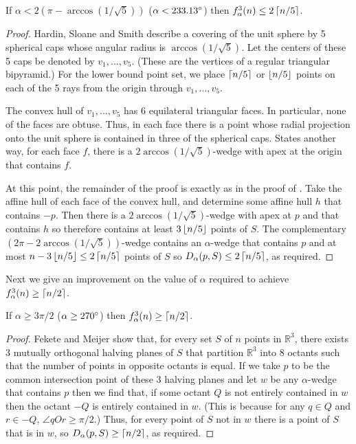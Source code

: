 \documentclass[lotsofwhite]{patmorin}
\newcommand{\R}{\mathbb{R}}
\begin{document}
\begin{lem}
If $\alpha < 2(\pi-\arccos(1/\sqrt{5}))$ ($\alpha < 233.13^\circ$) then $f^3_\alpha(n) \le 2\left\lceil n/5 \right\rceil$.
\end{lem}

\begin{proof}
Hardin, Sloane and Smith \cite{hssXX} describe a covering of the unit
sphere by 5 spherical caps whose angular radius is
$\arccos(1/\sqrt{5})$.  Let the centers of these 5 caps be denoted by
$v_1,\ldots,v_5$. (These are the vertices of a regular triangular
bipyramid.) For the lower bound point set, we place $\left\lceil n/5 \right\rceil$ or
$\left\lfloor n/5 \right\rfloor$ points on each of the 5 rays from the origin through
$v_1,\ldots,v_5$. 

The convex hull of $v_1,\ldots,v_5$ has 6 equilateral triangular
faces.  In particular, none of the faces are obtuse.  Thus, in each
face there is a point whose radial projection onto the unit sphere is
contained in three of the spherical caps. States another way, for each
face $f$, there is a $2\arccos(1/\sqrt{5})$-wedge with apex at the
origin that contains $f$.

At this point, the remainder of the proof is exactly as in the proof
of .  Take the affine hull of each face of the convex
hull, and determine some affine hull $h$ that contains $-p$.  Then
there is a $2\arccos(1/\sqrt{5})$-wedge with apex at $p$ and that
contains $h$ so therefore contains at least $3\left\lfloor n/5 \right\rfloor$ points of
$S$.  The complementary $(2\pi-2\arccos(1/\sqrt{5}))$-wedge contains
an $\alpha$-wedge that contains $p$ and at most $n-3\left\lfloor n/5 \right\rfloor\le
2\left\lceil n/5 \right\rceil$ points of $S$ so $D_\alpha(p,S)\le 2\left\lceil n/5 \right\rceil$, as
required.  
\end{proof}

Next we give an improvement on the value of $\alpha$ required to
achieve $f_\alpha^3(n)\ge\left\lceil n/2 \right\rceil$.

\begin{lem} 
If $\alpha\ge 3\pi/2$ ($\alpha\ge 270^\circ$) then $f_\alpha^3(n)\ge
\left\lceil n/2 \right\rceil$.
\end{lem}

\begin{proof}
Fekete and Meijer \cite{fm00} show that, for every set $S$ of $n$
points in $\R^3$, there exists 3 mutually orthogonal
halving planes of $S$ that partition $\R^3$ into 8 octants such that the
number of points in opposite octants is equal.  If we take $p$ to be
the common intersection point of these 3 halving planes and let $w$ be
any $\alpha$-wedge that contains $p$ then we find that, if some octant
$Q$ is not entirely contained in $w$ then the octant $-Q$ is entirely
contained in $w$.  (This is because for any $q\in Q$ and $r\in-Q$,
$\angle qOr\ge \pi/2$.) Thus, for every point of $S$ not in $w$ there
is a point of $S$ that is in $w$, so $D_\alpha(p,S)\ge \left\lceil n/2 \right\rceil$, as
required. 
\end{proof}
\end{document}

